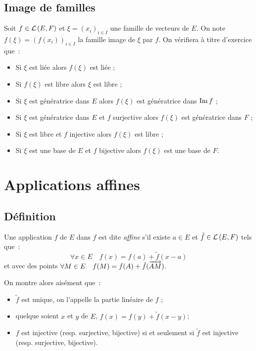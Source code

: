 \subsection{Image de familles}

Soit $f \in \mathcal{L}\left(E,F\right)$ et $\xi=(x_i)_{i \in I}$ une famille de vecteurs de $E$.
On note $f(\xi) = (f(x_i))_{i \in I}$ la famille image de $\xi$ par $f$. On
vérifiera à titre d'exercice que~:
\begin{itemize}
    \item Si $\xi$ est liée alors $f(\xi)$ est liée ;
    \item Si $f(\xi)$ est libre alors $\xi$ est libre ;
    \item Si $\xi$ est génératrice dans $E$ alors $f(\xi)$ est génératrice dans
        $\operatorname{Im}{f}$ ;
    \item Si $\xi$ est génératrice dans $E$ et $f$ surjective alors $f(\xi)$ est
        génératrice dans $F$ ;
    \item Si $\xi$ est libre et $f$ injective alors $f(\xi)$ est libre ;
    \item Si $\xi$ est une base de $E$ et $f$ bijective alors $f(\xi)$ est une base de $F$.
\end{itemize}
\section{Applications affines}

\subsection{Définition}

\begin{defdef}
    Une application $f$ de $E$ dans $f$ est dite \emph{affine} s'il existe $a
    \in E$ et $\tilde{f} \in \mathcal{L}\left(E,F\right)$ tels que~:
    \begin{equation}
        \forall x \in E \quad f(x)=f(a)+\tilde{f}(x-a)
    \end{equation}
    et avec des points $\forall M \in E \quad f(M)=f(A)+ \tilde{f}(\overrightarrow{AM})$.
\end{defdef}
On montre alors aisément que~:
\begin{itemize}
    \item $\tilde{f}$ est unique, on l'appelle la partie linéaire de $f$ ;
    \item quelque soient $x$ et $y$ de $E$, $f(x)=f(y)+\tilde{f}(x-y)$;
    \item $f$ est injective (resp. surjective, bijective) si et seulement si
        $\tilde{f}$ est injective (resp. surjective, bijective).
\end{itemize}
